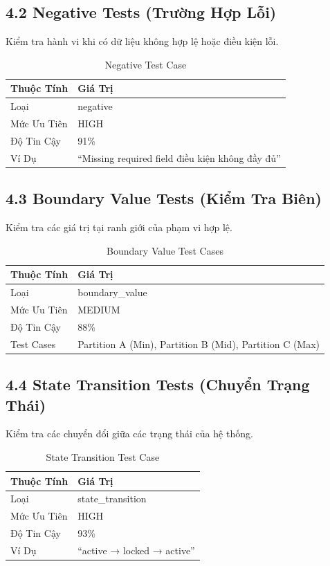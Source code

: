 \documentclass[14pt,a4paper]{article}
\begin{document}
\subsection{4.2 Negative Tests (Trường Hợp Lỗi)}
Kiểm tra hành vi khi có dữ liệu không hợp lệ hoặc điều kiện lỗi.

\begin{table}[h]
\centering
\begin{tabular}{|l|l|}
\hline
\textbf{Thuộc Tính} & \textbf{Giá Trị} \\
\hline
Loại & negative \\
\hline
Mức Ưu Tiên & HIGH \\
\hline
Độ Tin Cậy & 91\% \\
\hline
Ví Dụ & ``Missing required field điều kiện không đầy đủ'' \\
\hline
\end{tabular}
\caption{Negative Test Case}
\end{table}

\subsection{4.3 Boundary Value Tests (Kiểm Tra Biên)}
Kiểm tra các giá trị tại ranh giới của phạm vi hợp lệ.

\begin{table}[h]
\centering
\begin{tabular}{|l|l|}
\hline
\textbf{Thuộc Tính} & \textbf{Giá Trị} \\
\hline
Loại & boundary\_value \\
\hline
Mức Ưu Tiên & MEDIUM \\
\hline
Độ Tin Cậy & 88\% \\
\hline
Test Cases & Partition A (Min), Partition B (Mid), Partition C (Max) \\
\hline
\end{tabular}
\caption{Boundary Value Test Cases}
\end{table}

\subsection{4.4 State Transition Tests (Chuyển Trạng Thái)}
Kiểm tra các chuyển đổi giữa các trạng thái của hệ thống.

\begin{table}[h]
\centering
\begin{tabular}{|l|l|}
\hline
\textbf{Thuộc Tính} & \textbf{Giá Trị} \\
\hline
Loại & state\_transition \\
\hline
Mức Ưu Tiên & HIGH \\
\hline
Độ Tin Cậy & 93\% \\
\hline
Ví Dụ & ``active → locked → active'' \\
\hline
\end{tabular}
\caption{State Transition Test Case}
\end{table}
\end{document}
